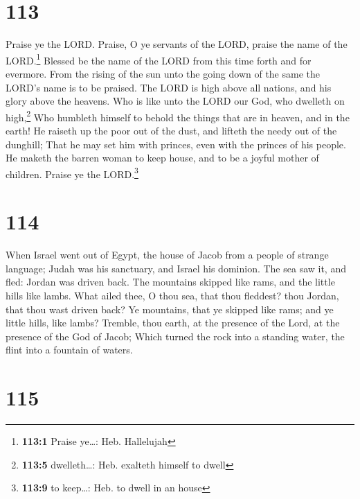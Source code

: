 \hypertarget{section-112}{%
\section{113}\label{section-112}}

 Praise ye the LORD. Praise, O ye servants of the LORD,
praise the name of the LORD.\footnote{\textbf{113:1} Praise ye\ldots:
  Heb. Hallelujah}  Blessed be the name of the LORD from
this time forth and for evermore.  From the rising of the
sun unto the going down of the same the LORD's name is to be praised.
 The LORD is high above all nations, and his glory above
the heavens.  Who is like unto the LORD our God, who
dwelleth on high,\footnote{\textbf{113:5} dwelleth\ldots: Heb. exalteth
  himself to dwell}  Who humbleth himself to behold the
things that are in heaven, and in the earth!  He raiseth
up the poor out of the dust, and lifteth the needy out of the dunghill;
 That he may set him with princes, even with the princes
of his people.  He maketh the barren woman to keep house,
and to be a joyful mother of children. Praise ye the LORD.\footnote{\textbf{113:9}
  to keep\ldots: Heb. to dwell in an house}

\hypertarget{section-113}{%
\section{114}\label{section-113}}

 When Israel went out of Egypt, the house of Jacob from a
people of strange language;  Judah was his sanctuary, and
Israel his dominion.  The sea saw it, and fled: Jordan was
driven back.  The mountains skipped like rams, and the
little hills like lambs.  What ailed thee, O thou sea,
that thou fleddest? thou Jordan, that thou wast driven back?
 Ye mountains, that ye skipped like rams; and ye little
hills, like lambs?  Tremble, thou earth, at the presence
of the Lord, at the presence of the God of Jacob;  Which
turned the rock into a standing water, the flint into a fountain of
waters.

\hypertarget{section-114}{%
\section{115}\label{section-114}}

